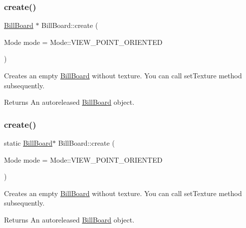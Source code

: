 \subsubsection{\texorpdfstring{create()}{create()}\hspace{0.1cm}{\footnotesize\ttfamily [1/6]}}
{\footnotesize\ttfamily \hyperlink{classBillBoard}{Bill\+Board} $\ast$ Bill\+Board\+::create (\begin{DoxyParamCaption}\item[{Mode}]{mode = {\ttfamily Mode\+:\+:VIEW\+\_\+POINT\+\_\+ORIENTED} }\end{DoxyParamCaption})\hspace{0.3cm}{\ttfamily [static]}}

Creates an empty \hyperlink{classBillBoard}{Bill\+Board} without texture. You can call set\+Texture method subsequently.

\begin{DoxyReturn}{Returns}
An autoreleased \hyperlink{classBillBoard}{Bill\+Board} object. 
\end{DoxyReturn}
\mbox{\label{classBillBoard_aad1420ccf3a2a8ad3ec9d102124167d0}} 
\subsubsection{\texorpdfstring{create()}{create()}\hspace{0.1cm}{\footnotesize\ttfamily [2/6]}}
{\footnotesize\ttfamily static \hyperlink{classBillBoard}{Bill\+Board}$\ast$ Bill\+Board\+::create (\begin{DoxyParamCaption}\item[{Mode}]{mode = {\ttfamily Mode\+:\+:VIEW\+\_\+POINT\+\_\+ORIENTED} }\end{DoxyParamCaption})\hspace{0.3cm}{\ttfamily [static]}}

Creates an empty \hyperlink{classBillBoard}{Bill\+Board} without texture. You can call set\+Texture method subsequently.

\begin{DoxyReturn}{Returns}
An autoreleased \hyperlink{classBillBoard}{Bill\+Board} object. 
\end{DoxyReturn}
\mbox{\label{classBillBoard_a99096279efac611e2d76734eff303672}} 
